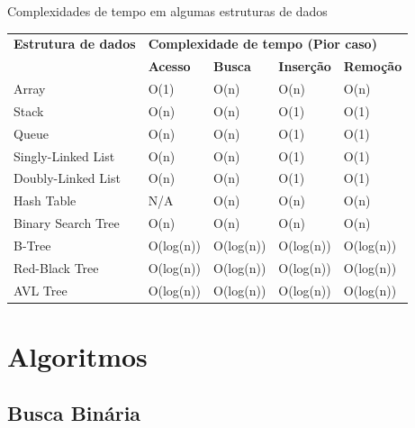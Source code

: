 \documentclass[
	12pt,    %
	oneside, %
	a4paper, %
	chapter=TITLE, %
	section=TITLE, %
	sumario=tradicional, %
	english, %
	brazil   %
] {abntex2}
\begin{document}
	\begin{quadro}
		\caption{Complexidades de tempo em algumas estruturas de dados}
		\label{quad:quad-bigO}
		\begin{tabular}{|l|l|l|l|l|}
			\cline{1-5}
			\textbf{Estrutura de dados}                         & \multicolumn{4}{l|}{\textbf{Complexidade de tempo (Pior caso)}}\\ \cline{1-5}
			& \textbf{Acesso} & \textbf{Busca} & \textbf{Inserção} & \textbf{Remoção} \\ \cline{1-5}
			Array              & O(1)            & O(n)           & O(n)              & O(n)             \\ \cline{1-5}
			Stack              & O(n)            & O(n)           & O(1)              & O(1)             \\ \cline{1-5}
			Queue              & O(n)            & O(n)           & O(1)              & O(1)             \\ \cline{1-5}
			Singly-Linked List & O(n)            & O(n)           & O(1)              & O(1)             \\ \cline{1-5}
			Doubly-Linked List & O(n)            & O(n)           & O(1)              & O(1)             \\ \cline{1-5}
			Hash Table         & N/A             & O(n)           & O(n)              & O(n)             \\ \cline{1-5}
			Binary Search Tree & O(n)            & O(n)           & O(n)              & O(n)             \\ \cline{1-5}
			B-Tree             & O(log(n))       & O(log(n))      & O(log(n))         & O(log(n))        \\ \cline{1-5}
			Red-Black Tree     & O(log(n))       & O(log(n))      & O(log(n))         & O(log(n))        \\ \cline{1-5}
			AVL Tree           & O(log(n))       & O(log(n))      & O(log(n))         & O(log(n)) \\       \cline{1-5}
		\end{tabular}
	\end{quadro}


	\chapter{Algoritmos}\label{sec:algoritmos}
	\section{Busca Binária}
	
\end{document}
